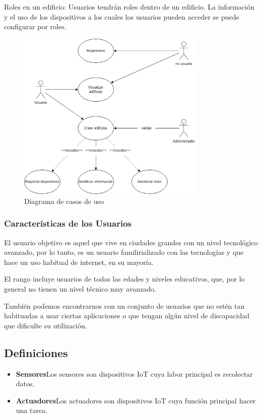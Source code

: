 \documentclass[12pt, a4paper, twoside]{article}
\newcommand\ttab{\tab \hspace{-5cm}}
\begin{document}
Roles en un edificio:
 Usuarios tendrán roles dentro de un edificio. La información y el uso de los dispositivos a los cuales
 los usuarios pueden acceder se puede configurar por roles.

\begin{figure}[h]
  \centering
  \includegraphics[width=0.8\textwidth]{UserCase.0.1.png}
  \caption{Diagrama de casos de uso}
\end{figure}

 \subsubsection{Características de los Usuarios}
 El usuario objetivo es aquel que vive en ciudades grandes con un nivel tecnológico avanzado,
 por lo tanto, es un usuario familirializado con las tecnologías y que hace un uso
 habitual de internet, en su mayoría.

 El rango incluye usuarios de todas las edades y niveles educativos, que, por lo general
 no tienen un nivel técnico muy avanzado.

 También podemos encontrarnos con un conjunto de usuarios que
 no estén tan habituadas a usar ciertas aplicaciones o que tengan algún nivel de discapacidad
 que dificulte su utilización.

\subsection{Definiciones}
\begin{itemize}
    \item \textbf{Sensores}\ttab Los sensores son dispositivos IoT cuya labor principal es recolectar datos.
    \item \textbf{Actuadores}\ttab Los actuadores son dispositivos IoT cuya función principal hacer una tarea.
\end{itemize}
\end{document}
